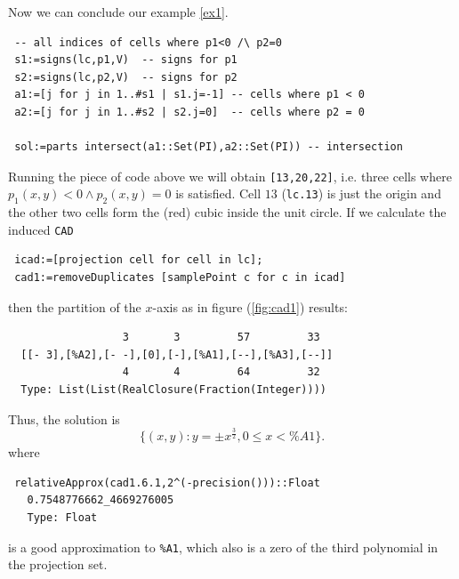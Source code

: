 \documentclass[12pt,a4paper]{article}
\newcommand{\CAD}{{\tt CAD}}
\begin{document}
Now we can conclude our example \ref{ex1}. 
%
\begin{lstlisting}  
 -- all indices of cells where p1<0 /\ p2=0
 s1:=signs(lc,p1,V)  -- signs for p1
 s2:=signs(lc,p2,V)  -- signs for p2
 a1:=[j for j in 1..#s1 | s1.j=-1] -- cells where p1 < 0
 a2:=[j for j in 1..#s2 | s2.j=0]  -- cells where p2 = 0

 sol:=parts intersect(a1::Set(PI),a2::Set(PI)) -- intersection
\end{lstlisting}
%
Running the piece of code above we will obtain {\tt [13,20,22]}, i.e. three
cells where $p_1(x,y)<0 \wedge p_2(x,y)=0$ is satisfied. Cell $13$ ({\tt lc.13})
is just the origin and the other two cells form the (red) cubic inside the 
unit circle. If we calculate the induced {\CAD} 
\begin{lstlisting}  
 icad:=[projection cell for cell in lc];
 cad1:=removeDuplicates [samplePoint c for c in icad]
\end{lstlisting}
then the partition of the $x$-axis as in figure (\ref{fig:cad1}) results:
\begin{verbatim}
                  3       3         57         33
  [[- 3],[%A2],[- -],[0],[-],[%A1],[--],[%A3],[--]]
                  4       4         64         32
  Type: List(List(RealClosure(Fraction(Integer))))
\end{verbatim}
Thus, the solution is
\begin{equation*}
    \{(x,y): y=\pm x^\frac{3}{2}, 0\leq x <\%A1\}.
\end{equation*}
where 
\begin{lstlisting}  
 relativeApprox(cad1.6.1,2^(-precision()))::Float
   0.7548776662_4669276005
   Type: Float  
\end{lstlisting}
is a good approximation to {\tt \%A1}, which also is a zero of the third 
polynomial in the projection set.
\end{document}
